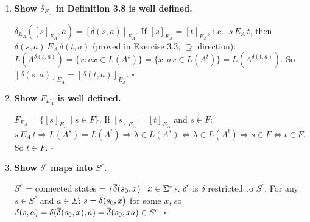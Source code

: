 \begin{enumerate}[{3.}1.]
($\supseteq$): $E_A\subseteq E_{iA}$ for all $i$ (by induction on $i$). $i=0$: $s\,E_A\,t\Rightarrow L(A^s)=L(A^t)\Rightarrow(\lambda\in L(A^s)\Leftrightarrow\lambda\in L(A^t))\Rightarrow(s\in F\Leftrightarrow t\in F)$. Step: if $E_A\subseteq E_{iA}$ and $s\,E_A\,t$, then $\delta(s,a)\,E_A\,\delta(t,a)$ (since $E_A$ is a right congruence on states -- actually prove this: $L(A^{\delta(s,a)})=\{x:ax\in L(A^s)\}=\{x:ax\in L(A^t)\}=L(A^{\delta(t,a)})$). So $\delta(s,a)\,E_A\,\delta(t,a)$, and by IH $\delta(s,a)\,E_{iA}\,\delta(t,a)$; also $s\,E_{iA}\,t$ by IH. Hence $s\,E_{i+1,A}\,t$. So $E_A\subseteq\bigcap_j E_{jA}$.

($\subseteq$): Show $\bigcap_j E_{jA}\subseteq E_A$. Suppose $s\,E_{jA}\,t$ for all $j$. By induction on $|x|$: $\DBAR(s,x)\,E_{0A}\,\DBAR(t,x)$ for all $x$, which means $\DBAR(s,x)\in F\Leftrightarrow\DBAR(t,x)\in F$, i.e., $x\in L(A^s)\Leftrightarrow x\in L(A^t)$. Proof: $|x|=0$: $s\,E_{0A}\,t$ (given). $|x|=n+1$, $x=ay$: $\DBAR(s,ay)=\DBAR(\delta(s,a),y)$. Since $s\,E_{n+1,A}\,t$ (given, as $n+1\leq j$ for large enough $j$... actually all $j$): $\delta(s,a)\,E_{nA}\,\delta(t,a)$ and $\delta(s,a)\,E_{jA}\,\delta(t,a)$ for all $j\geq 1$. By IH: $\DBAR(\delta(s,a),y)\,E_{0A}\,\DBAR(\delta(t,a),y)$. So $L(A^s)=L(A^t)$, i.e., $s\,E_A\,t$. $\square$

\item \textbf{Show $\delta_{E_A}$ in Definition 3.8 is well defined.}

$\delta_{E_A}([s]_{E_A},a)=[\delta(s,a)]_{E_A}$. If $[s]_{E_A}=[t]_{E_A}$, i.e., $s\,E_A\,t$, then $\delta(s,a)\,E_A\,\delta(t,a)$ (proved in Exercise 3.3, $\supseteq$ direction): $L(A^{\delta(s,a)})=\{x:ax\in L(A^s)\}=\{x:ax\in L(A^t)\}=L(A^{\delta(t,a)})$. So $[\delta(s,a)]_{E_A}=[\delta(t,a)]_{E_A}$. $\square$

\item \textbf{Show $F_{E_A}$ is well defined.}

$F_{E_A}=\{[s]_{E_A}\mid s\in F\}$. If $[s]_{E_A}=[t]_{E_A}$ and $s\in F$: $s\,E_A\,t\Rightarrow L(A^s)=L(A^t)\Rightarrow\lambda\in L(A^s)\Leftrightarrow\lambda\in L(A^t)\Rightarrow s\in F\Leftrightarrow t\in F$. So $t\in F$. $\square$

\item \textbf{Show $\delta^c$ maps into $S^c$.}

$S^c$ = connected states = $\{\overline{\delta}(s_0,x)\mid x\in\Sigma^*\}$. $\delta^c$ is $\delta$ restricted to $S^c$. For any $s\in S^c$ and $a\in\Sigma$: $s=\overline{\delta}(s_0,x)$ for some $x$, so $\delta(s,a)=\delta(\overline{\delta}(s_0,x),a)=\overline{\delta}(s_0,xa)\in S^c$. $\square$


\end{enumerate}
